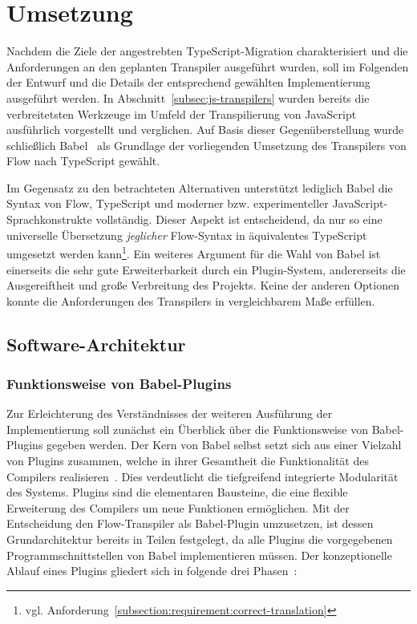\chapter{Umsetzung}

Nachdem die Ziele der angestrebten TypeScript-Migration charakterisiert und die Anforderungen an den geplanten Transpiler ausgeführt wurden, soll im Folgenden der Entwurf und die Details der entsprechend gewählten Implementierung ausgeführt werden.
In Abschnitt~\ref{subsec:js-transpilers} wurden bereits die verbreitetsten Werkzeuge im Umfeld der Transpilierung von JavaScript ausführlich vorgestellt und verglichen. Auf Basis dieser Gegenüberstellung wurde schließlich Babel~\autocite{BABEL} als Grundlage der vorliegenden Umsetzung des Transpilers von Flow nach TypeScript gewählt.

Im Gegensatz zu den betrachteten Alternativen unterstützt lediglich Babel die Syntax von Flow, TypeScript und moderner bzw. experimenteller JavaScript-Sprachkonstrukte vollständig. Dieser Aspekt ist entscheidend, da nur so eine universelle Übersetzung \emph{jeglicher} Flow-Syntax in äquivalentes TypeScript umgesetzt werden kann\footnote{vgl. Anforderung~\ref{subsection:requirement:correct-translation}}. Ein weiteres Argument für die Wahl von Babel ist einerseits die sehr gute Erweiterbarkeit durch ein Plugin-System, andererseits die Ausgereiftheit und große Verbreitung des Projekts. Keine der anderen Optionen konnte die Anforderungen des Transpilers in vergleichbarem Maße erfüllen.

\section{Software-Architektur}

\subsection{Funktionsweise von Babel-Plugins}

Zur Erleichterung des Verständnisses der weiteren Ausführung der Implementierung soll zunächst ein Überblick über die Funktionsweise von Babel-Plugins gegeben werden. Der Kern von Babel selbst setzt sich aus einer Vielzahl von Plugins zusammen, welche in ihrer Gesamtheit die Funktionalität des Compilers realisieren~\autocite{BABEL}. Dies verdeutlicht die tiefgreifend integrierte Modularität des Systems. Plugins sind die elementaren Bausteine, die eine flexible Erweiterung des Compilers um neue Funktionen ermöglichen.
Mit der Entscheidung den Flow-Transpiler als Babel-Plugin umzusetzen, ist dessen Grundarchitektur bereits in Teilen festgelegt, da alle Plugins die vorgegebenen Programmschnittstellen von Babel implementieren müssen. Der konzeptionelle Ablauf eines Plugins gliedert sich in folgende drei Phasen~\autocite{BABEL_HANDBOOK}:

